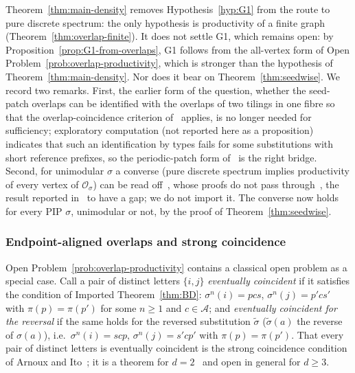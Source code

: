\documentclass[11pt]{amsart}
\theoremstyle{plain}
\theoremstyle{definition}
\theoremstyle{remark}
\newcommand{\A}{\mathcal{A}}
\newcommand{\PDS}{pure discrete spectrum}
\begin{document}
Theorem~\ref{thm:main-density} removes Hypothesis~\ref{hyp:G1} from the route to \PDS{}: the only hypothesis is productivity of a finite graph (Theorem~\ref{thm:overlap-finite}). It does not settle G1, which remains open: by Proposition~\ref{prop:G1-from-overlaps}, G1 follows from the all-vertex form of Open Problem~\ref{prob:overlap-productivity}, which is stronger than the hypothesis of Theorem~\ref{thm:main-density}. Nor does it bear on Theorem~\ref{thm:seedwise}. We record two remarks. First, the earlier form of the question, whether the seed-patch overlaps can be identified with the overlaps of two tilings in one fibre so that the overlap-coincidence criterion of~\cite{Solomyak97,SS,AL} applies, is no longer needed for sufficiency; exploratory computation (not reported here as a proposition) indicates that such an identification by types fails for some substitutions with short reference prefixes, so the periodic-patch form of~\cite{BSW} is the right bridge. Second, for unimodular $\sigma$ a converse (\PDS{} implies productivity of every vertex of $\mathcal O_\sigma$) can be read off~\cite[Cor.~9.4 and Prop.~17.2]{BK}, whose proofs do not pass through~\cite[Thm.~16.3]{BK}, the result reported in~\cite[\S1]{BSW} to have a gap; we do not import it. The converse now holds for every PIP $\sigma$, unimodular or not, by the proof of Theorem~\ref{thm:seedwise}.

\subsubsection*{Endpoint-aligned overlaps and strong coincidence}

Open Problem~\ref{prob:overlap-productivity} contains a classical open problem as a special case. Call a pair of distinct letters $\{i,j\}$ \emph{eventually coincident} if it satisfies the condition of Imported Theorem~\ref{thm:BD}: $\sigma^n(i)=pcs$, $\sigma^n(j)=p'cs'$ with $\pi(p)=\pi(p')$ for some $n\ge1$ and $c\in\A$; and \emph{eventually coincident for the reversal} if the same holds for the reversed substitution $\tilde\sigma$ ($\tilde\sigma(a)$ the reverse of $\sigma(a)$), i.e.\ $\sigma^n(i)=scp$, $\sigma^n(j)=s'cp'$ with $\pi(p)=\pi(p')$. That every pair of distinct letters is eventually coincident is the strong coincidence condition of Arnoux and Ito~\cite{AI}; it is a theorem for $d=2$~\cite{BD} and open in general for $d\ge3$.
\end{document}
